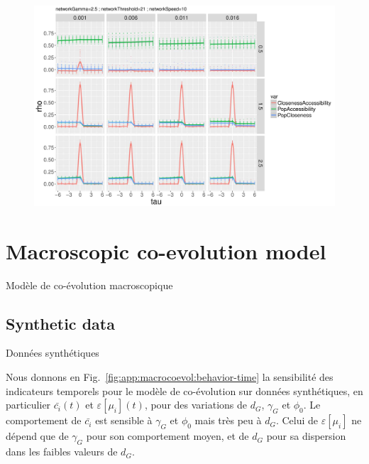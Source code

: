 \begin{figure}
	\includegraphics[width=\linewidth]{Figures/Final/A-macrocoevolexplo-laggedcorrs.jpg}
\end{figure}





\newpage

\section{Macroscopic co-evolution model}{Modèle de co-évolution macroscopique}

\label{app:sec:macrocoevol}



\subsection{Synthetic data}{Données synthétiques}


Nous donnons en Fig.~\ref{fig:app:macrocoevol:behavior-time} la sensibilité des indicateurs temporels pour le modèle de co-évolution sur données synthétiques, en particulier $\bar{c_i}(t)$ et $\varepsilon\left[\mu_i\right](t)$, pour des variations de $d_G$, $\gamma_G$ et $\phi_0$. Le comportement de $\bar{c_i}$ est sensible à $\gamma_G$ et $\phi_0$ mais très peu à $d_G$. Celui de $\varepsilon\left[\mu_i\right]$ ne dépend que de $\gamma_G$ pour son comportement moyen, et de $d_G$ pour sa dispersion dans les faibles valeurs de $d_G$.


